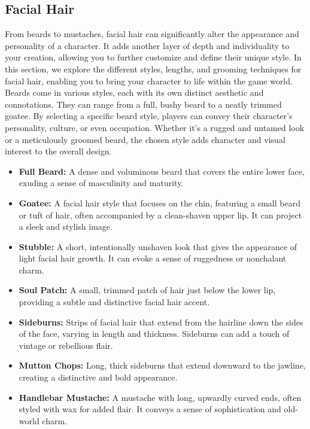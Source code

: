 \documentclass[12pt]{book}
\begin{document}
\subsection{\textbf{Facial Hair}}

From beards to mustaches, facial hair can significantly alter the appearance and personality of a character. It adds another layer of depth and individuality to your creation, allowing you to further customize and define their unique style. In this section, we explore the different styles, lengths, and grooming techniques for facial hair, enabling you to bring your character to life within the game world. Beards come in various styles, each with its own distinct aesthetic and connotations. They can range from a full, bushy beard to a neatly trimmed goatee. By selecting a specific beard style, players can convey their character's personality, culture, or even occupation. Whether it's a rugged and untamed look or a meticulously groomed beard, the chosen style adds character and visual interest to the overall design.

\begin{itemize}
    \item \textbf{Full Beard:} A dense and voluminous beard that covers the entire lower face, exuding a sense of masculinity and maturity.
    \item \textbf{Goatee:} A facial hair style that focuses on the chin, featuring a small beard or tuft of hair, often accompanied by a clean-shaven upper lip. It can project a sleek and stylish image.
    \item \textbf{Stubble:} A short, intentionally unshaven look that gives the appearance of light facial hair growth. It can evoke a sense of ruggedness or nonchalant charm.
    \item \textbf{Soul Patch:} A small, trimmed patch of hair just below the lower lip, providing a subtle and distinctive facial hair accent.
    \item \textbf{Sideburns:} Strips of facial hair that extend from the hairline down the sides of the face, varying in length and thickness. Sideburns can add a touch of vintage or rebellious flair.
    \item \textbf{Mutton Chops:} Long, thick sideburns that extend downward to the jawline, creating a distinctive and bold appearance.
    \item \textbf{Handlebar Mustache:} A mustache with long, upwardly curved ends, often styled with wax for added flair. It conveys a sense of sophistication and old-world charm.
\end{itemize}
\end{document}
